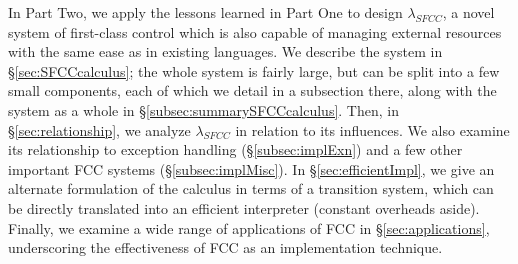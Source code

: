 \documentclass[11pt]{article}
\begin{document}
In Part Two, we apply the lessons learned in Part One to design $\lambda_{SFCC}$, a novel system of first-class control which is also capable of managing external resources with the same ease as in existing languages.
We describe the system in \S\ref{sec:SFCCcalculus};
the whole system is fairly large, but can be split into a few small components, each of which we detail in a subsection there, along with the system as a whole in \S\ref{subsec:summarySFCCcalculus}.
Then, in \S\ref{sec:relationship}, we analyze $\lambda_{SFCC}$ in relation to its influences.
We also examine its relationship to exception handling (\S\ref{subsec:implExn}) and a few other important FCC systems (\S\ref{subsec:implMisc}).
In \S\ref{sec:efficientImpl}, we give an alternate formulation of the calculus in terms of a transition system, which can be directly translated into an efficient interpreter (constant overheads aside).
Finally, we examine a wide range of applications of FCC in \S\ref{sec:applications}, underscoring the effectiveness of FCC as an implementation technique.
\end{document}
